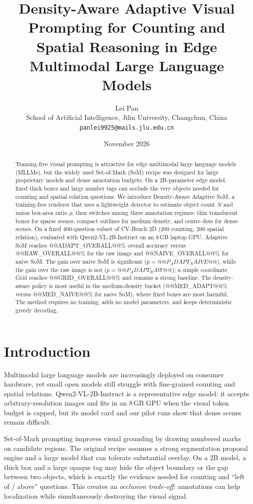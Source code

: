 \documentclass[10pt,twocolumn]{article}
\title{\vspace{-0.35in}\textbf{Density-Aware Adaptive Visual Prompting for Counting and Spatial Reasoning in Edge Multimodal Large Language Models}}
\author{Lei Pan\\
School of Artificial Intelligence, Jilin University, Changchun, China\\
\texttt{panlei9925@mails.jlu.edu.cn}}
\date{November 2026}
\newcommand{\method}{Density-Aware Adaptive SoM}
\begin{document}
\maketitle

\begin{abstract}
Training-free visual prompting is attractive for edge multimodal large language models (MLLMs), but the widely used Set-of-Mark (SoM) recipe was designed for large proprietary models and dense annotation budgets. On a 2B-parameter edge model, fixed thick boxes and large number tags can occlude the very objects needed for counting and spatial relation questions. We introduce \method{}, a training-free renderer that uses a lightweight detector to estimate object count $N$ and union box-area ratio $\rho$, then switches among three annotation regimes: thin translucent boxes for sparse scenes, compact outlines for medium density, and centre dots for dense scenes. On a fixed 400-question subset of CV-Bench 2D (200 counting, 200 spatial relation), evaluated with Qwen2-VL-2B-Instruct on an 8\,GB laptop GPU, Adaptive SoM reaches @@ADAPT_OVERALL@@\% overall accuracy versus @@RAW_OVERALL@@\% for the raw image and @@NAIVE_OVERALL@@\% for naive SoM. The gain over naive SoM is significant ($p=@@P_ADAPT_NAIVE@@$), while the gain over the raw image is not ($p=@@P_ADAPT_RAW@@$); a simple coordinate Grid reaches @@GRID_OVERALL@@\% and remains a strong baseline. The density-aware policy is most useful in the medium-density bucket (@@MED_ADAPT@@\% versus @@MED_NAIVE@@\% for naive SoM), where fixed boxes are most harmful. The method requires no training, adds no model parameters, and keeps deterministic greedy decoding.
\end{abstract}

\section{Introduction}
\label{sec:intro}
Multimodal large language models are increasingly deployed on consumer hardware, yet small open models still struggle with fine-grained counting and spatial relations. Qwen2-VL-2B-Instruct is a representative edge model: it accepts arbitrary-resolution images and fits in an 8\,GB GPU when the visual token budget is capped, but its model card and our pilot runs show that dense scenes remain difficult.

Set-of-Mark prompting improves visual grounding by drawing numbered marks on candidate regions. The original recipe assumes a strong segmentation proposal engine and a large model that can tolerate substantial overlay. On a 2B model, a thick box and a large opaque tag may hide the object boundary or the gap between two objects, which is exactly the evidence needed for counting and ``left of / above'' questions. This creates an \emph{occlusion trade-off}: annotations can help localization while simultaneously destroying the visual signal.
\end{document}
